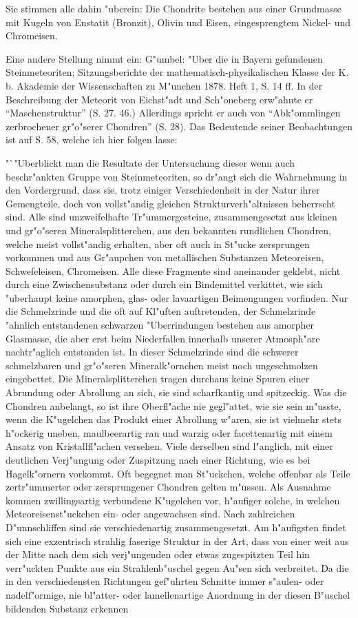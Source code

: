 \documentclass[a4paper, 11pt, oneside]{article}
\begin{document}
Sie stimmen alle dahin "uberein: Die Chondrite bestehen aus einer Grundmasse mit Kugeln von Enstatit (Bronzit), Olivin und Eisen, eingesprengtem Nickel- und Chromeisen.

Eine andere Stellung nimmt ein: G"umbel: "Uber die in Bayern gefundenen Steinmeteoriten; Sitzungsberichte der mathematisch-physikalischen Klasse der K. b. Akademie der Wissenschaften zu M"unchen 1878. Heft 1, S. 14 ff. In der Beschreibung der Meteorit von Eichst"adt und Sch"oneberg erw"ahnte er "`Maschenstruktur"' (S. 27. 46.) Allerdings spricht er auch von "`Abk"ommlingen zerbrochener gr"o"serer Chondren"' (S. 28). Das Bedeutende seiner Beobachtungen ist auf S. 58, welche ich hier folgen lasse:

"`"Uberblickt man die Resultate der Untersuchung dieser wenn auch beschr"ankten Gruppe von Steinmeteoriten, so dr"angt sich die Wahrnehmung in den Vordergrund, dass sie, trotz einiger Verschiedenheit in der Natur ihrer Gemengteile, doch von vollst"andig gleichen Strukturverh"altnissen beherrscht sind. Alle sind unzweifelhafte Tr"ummergesteine, zusammengesetzt aus kleinen und gr"o"seren Mineralsplitterchen, aus den bekannten rundlichen Chondren, welche meist vollst"andig erhalten, aber oft auch in St"ucke zersprungen vorkommen und aus Gr"aupchen von metallischen Substanzen Meteoreisen, Schwefeleisen, Chromeisen. Alle diese Fragmente sind aneinander geklebt, nicht durch eine Zwischensubstanz oder durch ein Bindemittel verkittet, wie sich "uberhaupt keine amorphen, glas- oder lavaartigen Beimengungen vorfinden. Nur die Schmelzrinde und die oft auf Kl"uften auftretenden, der Schmelzrinde "ahnlich entstandenen schwarzen "Uberrindungen bestehen aus amorpher Glasmasse, die aber erst beim Niederfallen innerhalb unserer Atmosph"are nachtr"aglich entstanden ist. In dieser Schmelzrinde sind die schwerer schmelzbaren und gr"o"seren Mineralk"ornchen meist noch ungeschmolzen eingebettet. Die Mineralsplitterchen tragen durchaus keine Spuren einer Abrundung oder Abrollung an sich, sie sind scharfkantig und spitzeckig. Was die Chondren anbelangt, so ist ihre Oberfl"ache nie gegl"attet, wie sie sein m"usste, wenn die K"ugelchen das Produkt einer Abrollung w"aren, sie ist vielmehr stets h"ockerig uneben, maulbeerartig rau und warzig oder facettenartig mit einem Ansatz von Kristallfl"achen versehen. Viele derselben sind l"anglich, mit einer deutlichen Verj"ungung oder Zuspitzung nach einer Richtung, wie es bei Hagelk"ornern vorkommt. Oft begegnet man St"uckchen, welche offenbar als Teile zertr"ummerter oder zersprungener Chondren gelten m"ussen. Als Ausnahme kommen zwillingsartig verbundene K"ugelchen vor, h"aufiger solche, in welchen Meteoreisenst"uckchen ein- oder angewachsen sind. Nach zahlreichen D"unnschliffen sind sie verschiedenartig zusammengesetzt. Am h"aufigsten findet sich eine exzentrisch strahlig faserige Struktur in der Art, dass von einer weit aus der Mitte nach dem sich verj"ungenden oder etwas zugespitzten Teil hin verr"uckten Punkte aus ein Strahlenb"uschel gegen Au"sen sich verbreitet. Da die in den verschiedensten Richtungen gef"uhrten Schnitte immer s"aulen- oder nadelf"ormige, nie bl"atter- oder lamellenartige Anordnung in der diesen B"uschel bildenden Substanz erkennen 
\end{document}
